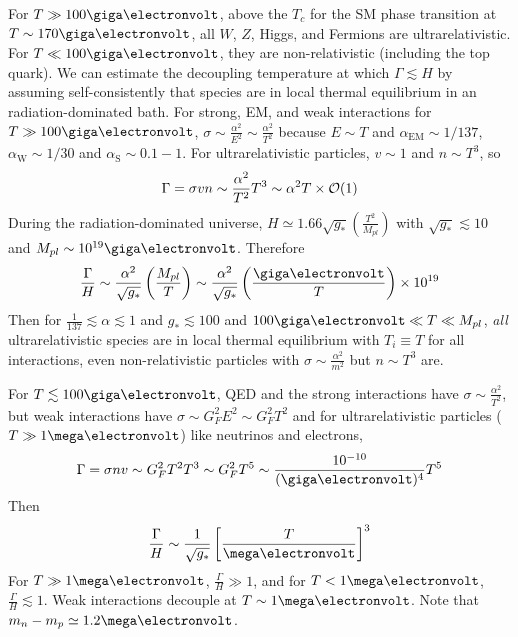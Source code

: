 \documentclass[a4paper,twoside,master.tex]{subfiles}
\begin{document}

For $ T \gg 100\giga\electronvolt $, above the $ T_c $ for the SM phase transition at $ T \sim 170\giga\electronvolt $, all $ W $, $ Z $, Higgs, and Fermions are ultrarelativistic. For $ T\ll 100\giga\electronvolt $, they are non-relativistic (including the top quark). We can estimate the decoupling temperature at which $ \Gamma \lesssim H  $ by assuming self-consistently that species are in local thermal equilibrium in an radiation-dominated bath. For strong, EM, and weak interactions for $ T \gg 100\giga\electronvolt $, $ \sigma \sim \frac{\alpha^2}{E^2} \sim \frac{\alpha^2}{T^2} $ because $ E \sim T $ and $ \alpha_{\text{EM}} \sim 1/137 $, $ \alpha_{\text{W}} \sim 1/30 $ and $ \alpha_{\text{S}} \sim 0.1-1 $. For ultrarelativistic particles, $ v \sim 1 $ and $ n \sim T^3 $, so
\begin{equation}
    \Gamma = \sigma v n \sim \frac{\alpha^2}{T^2} T^3 \sim \alpha^2 T \times \order{1}
\end{equation}
During the radiation-dominated universe, $ H \simeq 1.66 \sqrt{g_*} \left( \frac{T^2}{M_{pl}} \right) $ with $ \sqrt{g_*} \lesssim 10 $ and $ M_{pl} \sim 10^{19} \giga\electronvolt $. Therefore
\begin{equation}
    \frac{\Gamma}{H} \sim \frac{\alpha^2}{\sqrt{g_*}} \left( \frac{M_{pl}}{T} \right) \sim \frac{\alpha^2}{\sqrt{g_*}} \left( \frac{\giga\electronvolt}{T} \right) \times 10^{19}
\end{equation}
Then for $ \frac{1}{137} \lesssim \alpha \lesssim 1 $ and $ g_* \lesssim 100 $ and $ 100 \giga\electronvolt \ll T \ll M_{pl} $, \textit{all} ultrarelativistic species are in local thermal equilibrium with $ T_i \equiv T $ for all interactions, even non-relativistic particles with $ \sigma \sim \frac{\alpha^2}{m^2} $ but $ n \sim T^3 $ are.

For $ T \lesssim 100\giga\electronvolt $, QED and the strong interactions have $ \sigma \sim \frac{\alpha^2}{T^2} $, but weak interactions have $ \sigma \sim G_F^2 E^2 \sim G_F^2 T^2 $ and for ultrarelativistic particles ($ T \gg 1 \mega\electronvolt $) like neutrinos and electrons,
\begin{equation}
    \Gamma = \sigma n v \sim G^2_F T^2 T^3 \sim G_F^2 T^5 \sim \frac{10^{-10}}{(\giga\electronvolt)^4} T^5
\end{equation}
Then
\begin{equation}
    \frac{\Gamma}{H} \sim \frac{1}{\sqrt{g_*}} \left[ \frac{T}{\mega\electronvolt} \right]^3
\end{equation}
For $ T\gg 1 \mega\electronvolt $, $ \frac{\Gamma}{H} \gg 1 $, and for $ T < 1 \mega\electronvolt $, $ \frac{\Gamma}{H} \lesssim 1 $. Weak interactions decouple at $ T \sim 1 \mega\electronvolt $. Note that $ m_n - m_p \simeq 1.2 \mega\electronvolt $.
\end{document}
